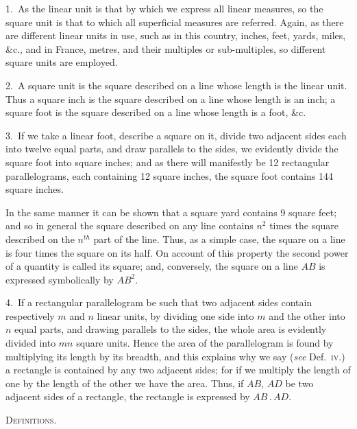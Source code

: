\documentclass[oneside]{book}
\begin{document}
\begin{footnotesize}
1.~As the linear unit is that by which we express all
linear measures, so the square unit is that to which all
superficial measures are referred. Again, as there are
different linear units in use, such as in this country,
inches, feet, yards, miles, \&c., and in France, metres,
and their multiples or sub-multiples, so different square
units are employed.

2.~A square unit is the square described on a line
whose length is the linear unit. Thus a square inch is
the square described on a line whose length is an inch;
a square foot is the square described on a line whose
length is a foot, \&c.

3.~If we take a linear foot, describe a square on it,
divide two adjacent sides each into twelve equal parts,
and draw parallels to the sides, we evidently divide the
square foot into square inches; and as there will manifestly
be 12 rectangular parallelograms, each containing
12 square inches, the square foot contains 144
square inches.

In the same manner it can be shown that a square
yard contains 9 square feet; and so in general the
square described on any line contains $n^2$ times the
square described on the $n^{th}$ part of the line. Thus, as
a simple case, the square on a line is four times the
square on its half. On account of this property the
second power of a quantity is called its square; and,
conversely, the square on a line $AB$ is expressed symbolically
by $AB^2$.

4.~If a rectangular parallelogram be such that two
adjacent sides contain respectively $m$ and $n$ linear units,
by dividing one side into $m$ and the other into $n$ equal
parts, and drawing parallels to the sides, the whole area
is evidently divided into $mn$ square units. Hence the
area of the parallelogram is found by multiplying its
length by its breadth, and this explains why we say
(\emph{see} Def.~\textsc{iv}.) a rectangle is contained by any two adjacent
sides; for if we multiply the length of one by
the length of the other we have the area. Thus, if
$AB$, $AD$ be two adjacent sides of a rectangle, the rectangle
is expressed by $AB\,.\,AD$.
\par\end{footnotesize}

\bigskip
\begin{center}
\textsc{Definitions.}
\end{center}
\end{document}
